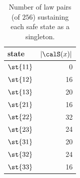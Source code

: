 \begin{table}[H]
\centering\small
\caption{Number of law pairs (of $256$) sustaining each safe state as a singleton.}
\label{tab:sustainers}
\begin{tabular}{lr}
\toprule
state & $|\calS(x)|$ \\
\midrule
$\st{11}$ & 0 \\
$\st{12}$ & 16 \\
$\st{13}$ & 20 \\
$\st{21}$ & 16 \\
$\st{22}$ & 32 \\
$\st{23}$ & 24 \\
$\st{31}$ & 20 \\
$\st{32}$ & 24 \\
$\st{33}$ & 16 \\
\bottomrule
\end{tabular}
\end{table}
